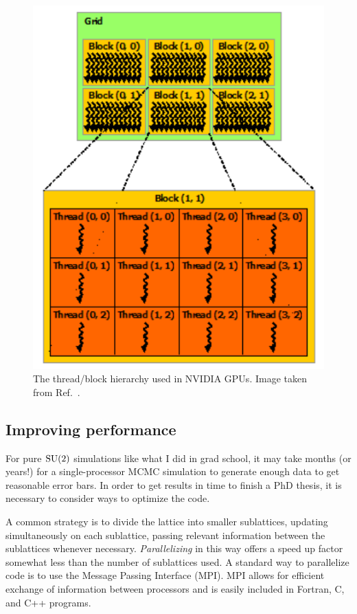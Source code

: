 \begin{figure}
\includegraphics[width=\linewidth]{figs/threadBlock.pdf}
\caption{The thread/block hierarchy used in NVIDIA GPUs.
Image taken from Ref.~\cite{NVIDIA}.}
\label{fig:threadBlock}
\end{figure}


\subsection{Improving performance}

For pure $\operatorname{SU}(2)$ simulations like what I did in grad school, 
it may take months (or years!) for a single-processor MCMC simulation to
generate enough data to get reasonable error bars. In order to get
results in time to finish a PhD thesis, it is necessary to consider ways to
optimize the code.

A common strategy is to divide the lattice into smaller sublattices, updating
simultaneously on each sublattice, passing relevant information between the
sublattices whenever necessary. {\it Parallelizing} in this way offers a speed
up factor somewhat less than the number of sublattices used. A standard way to
parallelize code is to use the Message Passing Interface (MPI). MPI allows
for efficient exchange of information between processors and is easily included
in Fortran, C, and C++ programs.

